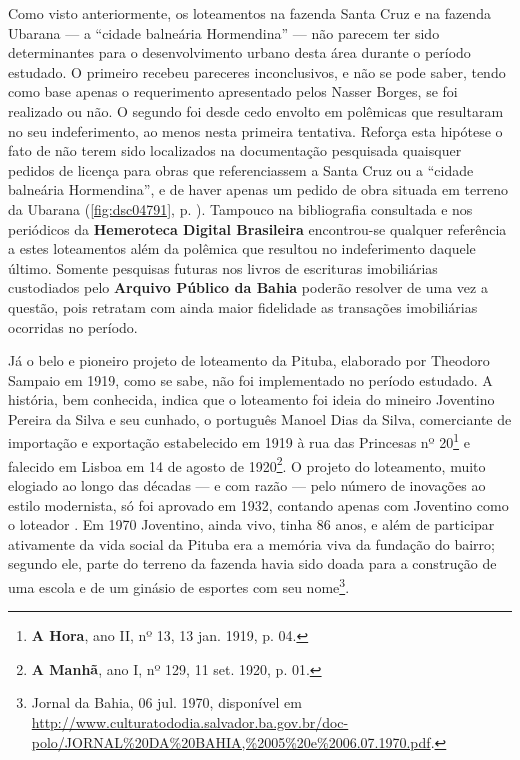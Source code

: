 Como visto anteriormente, os loteamentos na fazenda Santa Cruz e na fazenda Ubarana --- a ``cidade balneária Hormendina'' --- não parecem ter sido determinantes para o desenvolvimento urbano desta área durante o período estudado. O primeiro recebeu pareceres inconclusivos, e não se pode saber, tendo como base apenas o requerimento apresentado pelos Nasser Borges, se foi realizado ou não. O segundo foi desde cedo envolto em polêmicas que resultaram no seu indeferimento, ao menos nesta primeira tentativa. Reforça esta hipótese o fato de não terem sido localizados na documentação pesquisada quaisquer pedidos de licença para obras que referenciassem a Santa Cruz ou a ``cidade balneária Hormendina'', e de haver apenas um pedido de obra situada em terreno da Ubarana (\autoref{fig:dsc04791}, p. \pageref{fig:dsc04791}). Tampouco na bibliografia consultada e nos periódicos da \textbf{Hemeroteca Digital Brasileira} encontrou-se qualquer referência a estes loteamentos além da polêmica que resultou no indeferimento daquele último. Somente pesquisas futuras nos livros de escrituras imobiliárias custodiados pelo \textbf{Arquivo Público da Bahia} poderão resolver de uma vez a questão, pois retratam com ainda maior fidelidade as transações imobiliárias ocorridas no período.

Já o belo e pioneiro projeto de loteamento da Pituba, elaborado por Theodoro Sampaio em 1919, como se sabe, não foi implementado no período estudado. A história, bem conhecida, indica que o loteamento foi ideia do mineiro Joventino Pereira da Silva e seu cunhado, o português Manoel Dias da Silva, comerciante de importação e exportação estabelecido em 1919 à rua das Princesas nº 20\footnote{\textbf{A Hora}, ano II, nº 13, 13 jan. 1919, p. 04.} e falecido em Lisboa em 14 de agosto de 1920\footnote{\textbf{A Manhã}, ano I, nº 129, 11 set. 1920, p. 01.}. O projeto do loteamento, muito elogiado ao longo das décadas --- e com razão --- pelo número de inovações ao estilo modernista, só foi aprovado em 1932, contando apenas com Joventino como o loteador \cite{leme_urbanismo_1999,santos_theodoro_2010}. Em 1970 Joventino, ainda vivo, tinha 86 anos, e além de participar ativamente da vida social da Pituba era a memória viva da fundação do bairro; segundo ele, parte do terreno da fazenda havia sido doada para a construção de uma escola e de um ginásio de esportes com seu nome\footnote{Jornal da Bahia, 06 jul. 1970, disponível em \url{http://www.culturatododia.salvador.ba.gov.br/doc-polo/JORNAL\%20DA\%20BAHIA,\%2005\%20e\%2006.07.1970.pdf}.}. 

